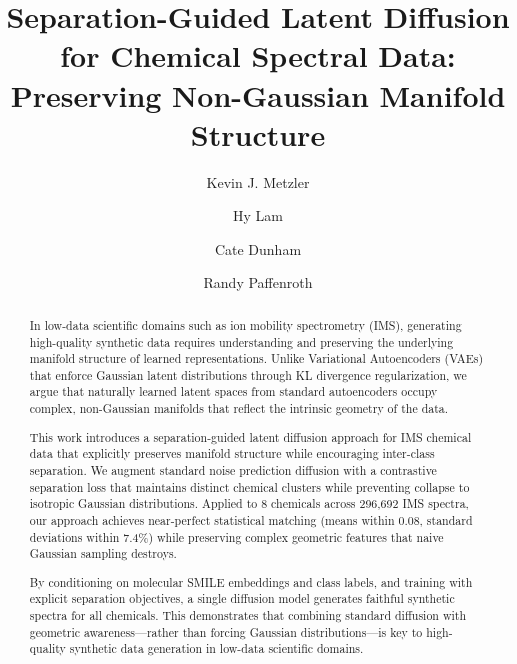 \documentclass[sigconf]{acmart}
\begin{document}
\title{Separation-Guided Latent Diffusion for Chemical Spectral Data: Preserving Non-Gaussian Manifold Structure}

\author{Kevin J. Metzler}

\author{Hy Lam}

\author{Cate Dunham}

\author{Randy Paffenroth}

\renewcommand{\shortauthors}{KJ. Metzler et al.}

\begin{abstract}
In low-data scientific domains such as ion mobility spectrometry (IMS), generating high-quality synthetic data requires understanding and preserving the underlying manifold structure of learned representations. Unlike Variational Autoencoders (VAEs) that enforce Gaussian latent distributions through KL divergence regularization, we argue that naturally learned latent spaces from standard autoencoders occupy complex, non-Gaussian manifolds that reflect the intrinsic geometry of the data.

This work introduces a separation-guided latent diffusion approach for IMS chemical data that explicitly preserves manifold structure while encouraging inter-class separation. We augment standard noise prediction diffusion with a contrastive separation loss that maintains distinct chemical clusters while preventing collapse to isotropic Gaussian distributions. Applied to 8 chemicals across 296,692 IMS spectra, our approach achieves near-perfect statistical matching (means within 0.08, standard deviations within 7.4\%) while preserving complex geometric features that naive Gaussian sampling destroys.

By conditioning on molecular SMILE embeddings and class labels, and training with explicit separation objectives, a single diffusion model generates faithful synthetic spectra for all chemicals. This demonstrates that combining standard diffusion with geometric awareness—rather than forcing Gaussian distributions—is key to high-quality synthetic data generation in low-data scientific domains.
\end{abstract}
\end{document}

